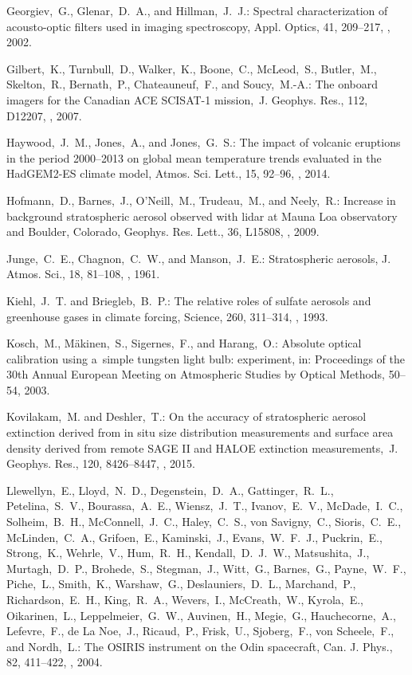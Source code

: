 \documentclass[amt]{copernicus}
\begin{document}
\begin{thebibliography}{99}
Georgiev,~G., Glenar,~D.~A., and Hillman,~J.~J.: Spectral characterization of
acousto-optic filters used in imaging spectroscopy, Appl. Optics, 41,
209--217,
,
2002.


Gilbert,~K., Turnbull,~D., Walker,~K., Boone,~C., McLeod,~S., Butler,~M.,
Skelton,~R., Bernath,~P., Chateauneuf,~F., and Soucy,~M.-A.: The onboard
imagers for the Canadian ACE SCISAT-1 mission,~J. Geophys. Res., 112, D12207,
, 2007.


Haywood,~J.~M., Jones,~A., and Jones,~G.~S.: The impact of volcanic eruptions
in the period 2000--2013 on global mean temperature trends evaluated in the
HadGEM2-ES climate model, Atmos. Sci. Lett., 15, 92--96,
, 2014.


Hofmann,~D., Barnes,~J., O'Neill,~M., Trudeau,~M., and Neely,~R.: Increase in
background stratospheric aerosol observed with lidar at Mauna Loa observatory
and Boulder, Colorado, Geophys. Res. Lett., 36, L15808,
,
2009.


Junge,~C.~E., Chagnon,~C.~W., and Manson,~J.~E.: Stratospheric aerosols, J.
Atmos. Sci., 18, 81--108,
,
1961.


Kiehl,~J.~T. and Briegleb,~B.~P.: The relative roles of sulfate aerosols and
greenhouse gases in climate forcing, Science, 260, 311--314,
,
1993.


Kosch,~M., M\"{a}kinen,~S., Sigernes,~F., and Harang,~O.: Absolute optical
calibration using a~simple tungsten light bulb: experiment, in: Proceedings
of the 30th Annual European Meeting on Atmospheric Studies by Optical
Methods, 50--54, 2003.


Kovilakam,~M. and Deshler,~T.: On the accuracy of stratospheric aerosol
extinction derived from in situ size distribution measurements and surface
area density derived from remote SAGE II and HALOE extinction
measurements,~J. Geophys. Res., 120, 8426--8447,
,
2015.


Llewellyn,~E., Lloyd,~N.~D., Degenstein,~D.~A., Gattinger,~R.~L.,
Petelina,~S.~V., Bourassa,~A.~E., Wiensz,~J.~T., Ivanov,~E.~V.,
McDade,~I.~C., Solheim,~B.~H., McConnell,~J.~C., Haley,~C.~S., von
Savigny,~C., Sioris,~C.~E., McLinden,~C.~A., Grifoen,~E., Kaminski,~J.,
Evans,~W.~F.~J., Puckrin,~E., Strong,~K., Wehrle,~V., Hum,~R.~H.,
Kendall,~D.~J.~W., Matsushita,~J., Murtagh,~D.~P., Brohede,~S., Stegman,~J.,
Witt,~G., Barnes,~G., Payne,~W.~F., Piche,~L., Smith,~K., Warshaw,~G.,
Deslauniers,~D.~L., Marchand,~P., Richardson,~E.~H., King,~R.~A., Wevers,~I.,
McCreath,~W., Kyrola,~E., Oikarinen,~L., Leppelmeier,~G.~W., Auvinen,~H.,
Megie,~G., Hauchecorne,~A., Lefevre,~F., de La Noe,~J., Ricaud,~P.,
Frisk,~U., Sjoberg,~F., von Scheele,~F., and Nordh,~L.: The OSIRIS instrument
on the Odin spacecraft, Can. J. Phys., 82, 411--422,
, 2004.



\end{thebibliography}
\end{document}
